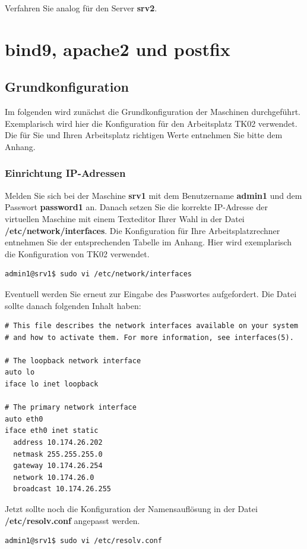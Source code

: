 Verfahren Sie analog für den Server \textbf{srv2}.

\section{bind9, apache2 und postfix}

\subsection{Grundkonfiguration}

Im folgenden wird zunächst die Grundkonfiguration der Maschinen durchgeführt. Exemplarisch wird hier die Konfiguration für den Arbeitsplatz TK02 verwendet. Die für Sie
und Ihren Arbeitsplatz richtigen Werte entnehmen Sie bitte dem Anhang.

\subsubsection{Einrichtung IP-Adressen}

Melden Sie sich bei der Maschine \textbf{srv1} mit dem Benutzername \textbf{admin1} und dem Passwort \textbf{password1} an. Danach 
setzen Sie die korrekte IP-Adresse der virtuellen Maschine mit einem Texteditor Ihrer Wahl in der Datei \\
\textbf{/etc/network/interfaces}. Die Konfiguration für Ihre Arbeitsplatzrechner entnehmen Sie der entsprechenden Tabelle im Anhang. Hier wird exemplarisch die Konfiguration
von TK02 verwendet.

\begin{lstlisting}
admin1@srv1$ sudo vi /etc/network/interfaces
\end{lstlisting}
Eventuell werden Sie erneut zur Eingabe des Passwortes aufgefordert. Die Datei sollte danach folgenden Inhalt haben:


\begin{lstlisting}
# This file describes the network interfaces available on your system
# and how to activate them. For more information, see interfaces(5).

# The loopback network interface
auto lo
iface lo inet loopback

# The primary network interface
auto eth0
iface eth0 inet static
  address 10.174.26.202
  netmask 255.255.255.0
  gateway 10.174.26.254
  network 10.174.26.0
  broadcast 10.174.26.255
\end{lstlisting}

Jetzt sollte noch die Konfiguration der Namensauflösung in der Datei \\ \textbf{/etc/resolv.conf} angepasst werden. 
\begin{lstlisting}
admin1@srv1$ sudo vi /etc/resolv.conf
\end{lstlisting}

